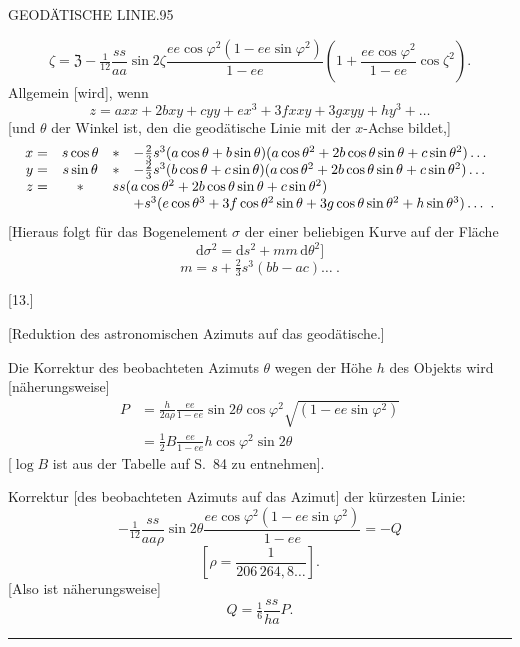 \clearpage
\noindent\mbox{}\hfill GEODÄTISCHE LINIE.\hfill 95\par
\[
\zeta=\mathfrak Z-\tfrac1{12}\frac{ss}{aa}\sin2\zeta\frac{ee\cos\varphi^2(1-ee\sin\varphi^2)}{1-ee}\left(1+\frac{ee\cos\varphi^2}{1-ee}\cos\zeta^2\right).
\]
Allgemein [wird], wenn
\[
z=axx+2bxy+cyy+ex^3+3fxxy+3gxyy+hy^3+\ldots
\]
[und $\theta$ der Winkel ist, den die geodätische Linie mit der $x$-Achse bildet,]
\[
\begin{array}{rcll}
x=&s\cos\theta&*&-\tfrac23s^3(a\cos\theta+b\sin\theta)(a\cos\theta^2+2b\cos\theta\sin\theta+c\sin\theta^2)\ldots\\
y=&s\sin\theta&*&-\tfrac23s^3(b\cos\theta+c\sin\theta)(a\cos\theta^2+2b\cos\theta\sin\theta+c\sin\theta^2)\ldots\\
z=&*&\multicolumn{2}{l}{ss(a\cos\theta^2+2b\cos\theta\sin\theta+c\sin\theta^2)}\\
&&&+s^3(e\cos\theta^3+3f\cos\theta^2\sin\theta+3g\cos\theta\sin\theta^2+h\sin\theta^3)\ldots\ .
\end{array}
\]
[Hieraus folgt für das Bogenelement $\sigma$ der einer beliebigen Kurve auf der Fläche
\[
\mathrm d\sigma^2=\mathrm ds^2+mm\,\mathrm d\theta^2]
\]
\[
m=s+\tfrac23s^3(bb-ac)\ldots\ .
\]
\begin{center}[13.]\end{center}
\begin{center}[Reduktion des astronomischen Azimuts auf das geodätische.]\end{center}
Die Korrektur des beobachteten Azimuts $\theta$ wegen der Höhe $h$ des Objekts wird [näherungsweise]
\[
\begin{aligned}
P&=\frac h{2a\rho}\frac{ee}{1-ee}\sin2\theta\cos\varphi^2\sqrt{(1-ee\sin\varphi^2)}\\
&=\tfrac12B\frac{ee}{1-ee}h\cos\varphi^2\sin2\theta
\end{aligned}
\]
[$\log B$ ist aus der Tabelle auf S.\ 84 zu entnehmen].

Korrektur [des beobachteten Azimuts auf das Azimut] der kürzesten Linie:
\[
-\tfrac1{12}\frac{ss}{aa\rho}\sin2\theta\frac{ee\cos\varphi^2(1-ee\sin\varphi^2)}{1-ee}=-Q
\]
\[
\left[\rho=\frac1{206\,264{,}8\ldots}\right].
\]
[Also ist näherungsweise]
\[
Q=\tfrac16\frac{ss}{ha}P.
\]
\begin{center}\rule{.18\textwidth}{.4pt}\end{center}

